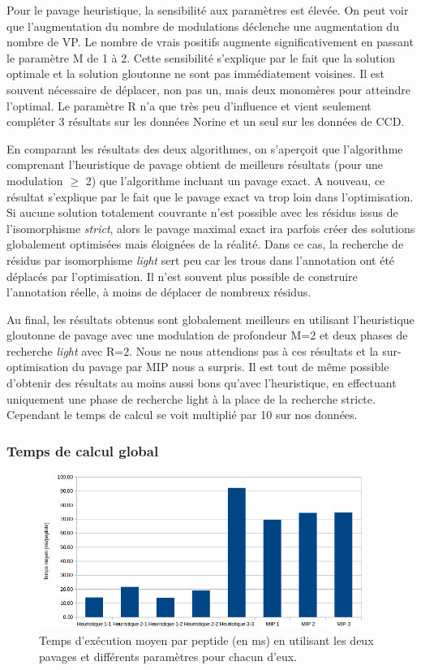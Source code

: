 Pour le pavage heuristique, la sensibilité aux paramètres est élevée.
On peut voir que l'augmentation du nombre de modulations déclenche une augmentation du nombre de VP.
Le nombre de vrais positifs augmente significativement en passant le paramètre M de 1 à 2.
Cette sensibilité s'explique par le fait que la solution optimale et la solution gloutonne ne sont pas immédiatement voisines.
Il est souvent nécessaire de déplacer, non pas un, mais deux monomères pour atteindre l'optimal.
Le paramètre R n'a que très peu d'influence et vient seulement compléter 3 résultats sur les données Norine et un seul sur les données de CCD.

En comparant les résultats des deux algorithmes, on s'aperçoit que l'algorithme comprenant l'heuristique de pavage obtient de meilleurs résultats (pour une modulation $\ge$ 2) que l'algorithme incluant un pavage exact.
A nouveau, ce résultat s'explique par le fait que le pavage exact va trop loin dans l'optimisation.
Si aucune solution totalement couvrante n'est possible avec les résidus issus de l'isomorphisme \textit{strict}, alors le pavage maximal exact ira parfois créer des solutions globalement optimisées mais éloignées de la réalité.
Dans ce cas, la recherche de résidus par isomorphisme \textit{light} sert peu car les trous dans l'annotation ont été déplacés par l'optimisation.
Il n'est souvent plus possible de construire l'annotation réelle, à moins de déplacer de nombreux résidus.

Au final, les résultats obtenus sont globalement meilleurs en utilisant l'heuristique gloutonne de pavage avec une modulation de profondeur M=2 et deux phases de recherche \textit{light} avec R=2.
Nous ne nous attendions pas à ces résultats et la sur-optimisation du pavage par MIP nous a surpris.
Il est tout de même possible d'obtenir des résultats au moins aussi bons qu'avec l'heuristique, en effectuant uniquement une phase de recherche light à la place de la recherche stricte.
Cependant le temps de calcul se voit multiplié par 10 sur nos données.


\subsubsection{Temps de calcul global}

\begin{figure}[!ht]
  \begin{center}
    \includegraphics[width=400px]{Figures/s2m/results/temps.png}
    \caption{\label{temps_general}Temps d'exécution moyen par peptide (en ms) en utilisant les deux pavages et différents paramètres pour chacun d'eux.}
  \end{center}
\end{figure}

